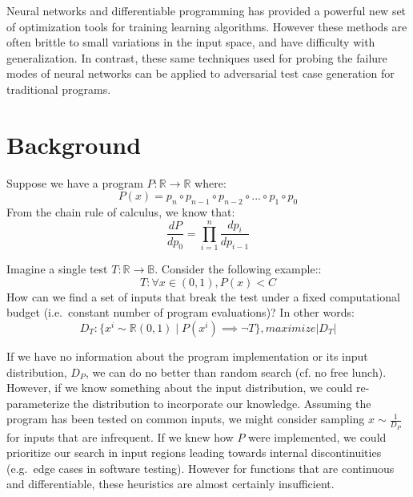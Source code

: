 \documentclass[12pt,initial,twoside,maitrise]{dms}
\numberwithin{equation}{section}
\numberwithin{table}{chapter}
\numberwithin{figure}{chapter}
\begin{document}
Neural networks and differentiable programming has provided a powerful new set of optimization tools for training learning algorithms. However these methods are often brittle to small variations in the input space, and have difficulty with generalization. In contrast, these same techniques used for probing the failure modes of neural networks can be applied to adversarial test case generation for traditional programs.

\section{Background}

Suppose we have a program $P: \mathbb{R}\rightarrow\mathbb{R}$ where:
%
\begin{equation}
    P(x)=p_n \circ p_{n-1} \circ p_{n-2} \circ ... \circ p_1 \circ p_0
\end{equation}
%
From the chain rule of calculus, we know that:
%
\begin{equation}
    \frac{dP}{dp_0} = {\displaystyle \prod_{i=1}^{n} \frac{dp_{i}}{dp_{i-1}}}
\end{equation}

%
%
Imagine a single test $T: \mathbb{R} \rightarrow \mathbb{B}$. Consider the following example::
%
\begin{equation}
    T: \forall x \in (0, 1), P(x) < C
\end{equation}
%
How can we find a set of inputs that break the test under a fixed computational budget (i.e.\ constant number of program evaluations)? In other words:
%
\begin{equation}
    D_T: \{ x^i \sim \mathbb{R}(0, 1) \mid P(x^i) \implies \neg T \}, maximize |D_T|
\end{equation}
%

If we have no information about the program implementation or its input distribution, $D_P$, we can do no better than random search (cf. no free lunch). However, if we know something about the input distribution, we could re-parameterize the distribution to incorporate our knowledge. Assuming the program has been tested on common inputs, we might consider sampling $x \sim \frac{1}{D_P}$ for inputs that are infrequent. If we knew how $P$ were implemented, we could prioritize our search in input regions leading towards internal discontinuities (e.g.\ edge cases in software testing). However for functions that are continuous and differentiable, these heuristics are almost certainly insufficient.
\end{document}
